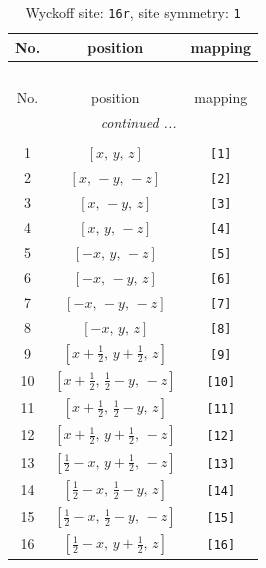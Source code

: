 \documentclass[fleqn,8pt]{jsarticle}
\begin{document}
\begin{longtable}{ccc}
\caption{Wyckoff site: {\tt 16r}, site symmetry: {\tt 1}}
 \\
 \hline \hline
No. & position & mapping \\ \hline \endfirsthead

\multicolumn{2}{l}{\tablename\ \thetable{}} \\
 \hline \hline
No. & position & mapping \\ \hline \endhead

 \hline \hline
\multicolumn{2}{r}{\footnotesize\it continued ...} \\ \endfoot

 \hline \hline
\multicolumn{2}{r}{} \\ \endlastfoot

1 & $\left[ x,\, y,\, z \right]$ & {\tt [1]} \\ \hline
2 & $\left[ x,\, - y,\, - z \right]$ & {\tt [2]} \\ \hline
3 & $\left[ x,\, - y,\, z \right]$ & {\tt [3]} \\ \hline
4 & $\left[ x,\, y,\, - z \right]$ & {\tt [4]} \\ \hline
5 & $\left[ - x,\, y,\, - z \right]$ & {\tt [5]} \\ \hline
6 & $\left[ - x,\, - y,\, z \right]$ & {\tt [6]} \\ \hline
7 & $\left[ - x,\, - y,\, - z \right]$ & {\tt [7]} \\ \hline
8 & $\left[ - x,\, y,\, z \right]$ & {\tt [8]} \\ \hline
9 & $\left[ x + \frac{1}{2},\, y + \frac{1}{2},\, z \right]$ & {\tt [9]} \\ \hline
10 & $\left[ x + \frac{1}{2},\, \frac{1}{2} - y,\, - z \right]$ & {\tt [10]} \\ \hline
11 & $\left[ x + \frac{1}{2},\, \frac{1}{2} - y,\, z \right]$ & {\tt [11]} \\ \hline
12 & $\left[ x + \frac{1}{2},\, y + \frac{1}{2},\, - z \right]$ & {\tt [12]} \\ \hline
13 & $\left[ \frac{1}{2} - x,\, y + \frac{1}{2},\, - z \right]$ & {\tt [13]} \\ \hline
14 & $\left[ \frac{1}{2} - x,\, \frac{1}{2} - y,\, z \right]$ & {\tt [14]} \\ \hline
15 & $\left[ \frac{1}{2} - x,\, \frac{1}{2} - y,\, - z \right]$ & {\tt [15]} \\ \hline
16 & $\left[ \frac{1}{2} - x,\, y + \frac{1}{2},\, z \right]$ & {\tt [16]} \\
\end{longtable}
\end{document}
